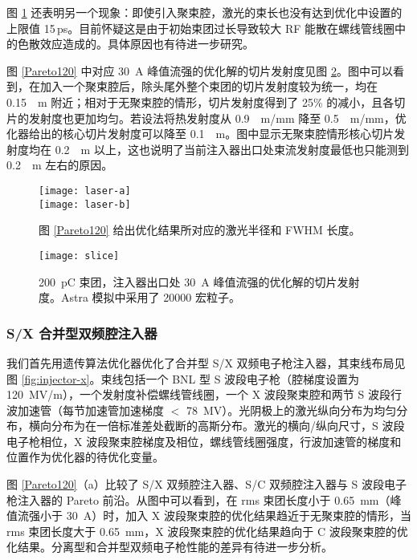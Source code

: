 图 \ref{laser_dimension} 还表明另一个现象：即使引入聚束腔，激光的束长也没有达到优化中设置的上限值 15\,ps。目前怀疑这是由于初始束团过长导致较大 RF 能散在螺线管线圈中的色散效应造成的。具体原因也有待进一步研究。

图 \ref{Pareto120} 中对应 \SI{30}{A} 峰值流强的优化解的切片发射度见图 \ref{slice_emittance}。图中可以看到，在加入一个聚束腔后，除头尾外整个束团的切片发射度较为统一，均在 \SI{0.15}{\mu m} 附近；相对于无聚束腔的情形，切片发射度得到了 25\% 的减小，且各切片的发射度也更加均匀。若设法将热发射度从 \SI{0.9}{\mu m/mm} 降至 \SI{0.5}{\mu m/mm}，优化器给出的核心切片发射度可以降至 \SI{0.1}{\mu m}。图中显示无聚束腔情形核心切片发射度均在 \SI{0.2}{\mu m} 以上，这也说明了当前注入器出口处束流发射度最低也只能测到 \SI{0.2}{\mu m} 左右的原因。

\begin{figure}[htbp]
	\centering
	\texttt{[image: laser-a]}\\
	\texttt{[image: laser-b]}
	\caption{图 \ref{Pareto120} 给出优化结果所对应的激光半径和 FWHM 长度。}
	\label{laser_dimension}
\end{figure}

\begin{figure}[htbp]
	\centering
	\texttt{[image: slice]}
	\caption{\SI{200}{pC} 束团，注入器出口处 \SI{30}{A} 峰值流强的优化解的切片发射度。Astra 模拟中采用了 20000 宏粒子。}
	\label{slice_emittance}
\end{figure}

\subsubsection{S/X 合并型双频腔注入器}
我们首先用遗传算法优化器优化了合并型 S/X 双频电子枪注入器，其束线布局见图 \ref{fig:injector-x}。束线包括一个 BNL 型 S 波段电子枪（腔梯度设置为 \SI{120}{MV/m}），一个发射度补偿螺线管线圈，一个 X 波段聚束腔和两节 S 波段行波加速管（每节加速管加速梯度 $<$ \SI{78}{MV}）。光阴极上的激光纵向分布为均匀分布，横向分布为在一倍标准差处截断的高斯分布。激光的横向/纵向尺寸，S 波段电子枪相位，X 波段聚束腔梯度及相位，螺线管线圈强度，行波加速管的梯度和位置作为优化器的待优化变量。

图 \ref{Pareto120}（a）比较了 S/X 双频腔注入器、S/C 双频腔注入器与 S 波段电子枪注入器的 Pareto 前沿。从图中可以看到，在 rms 束团长度小于 \SI{0.65}{mm}（峰值流强小于 \SI{30}{A}）时，加入 X 波段聚束腔的优化结果趋近于无聚束腔的情形，当 rms 束团长度大于 \SI{0.65}{mm}，X 波段聚束腔的优化结果趋向于 C 波段聚束腔的优化结果。分离型和合并型双频电子枪性能的差异有待进一步分析。

